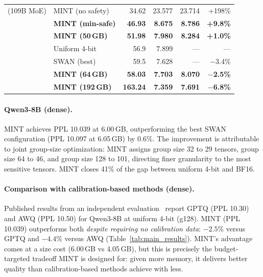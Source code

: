 \documentclass{article}
\begin{document}
\begin{table}[h]
\begin{tabular}{llrrrr}
(109B MoE) & MINT (no safety) & 34.62 & 23.577 & 23.714 & +198\% \\
 & \textbf{MINT (min-safe)} & \textbf{46.93} & \textbf{8.675} & \textbf{8.786} & \textbf{+9.8\%} \\
 & \textbf{MINT (50\,GB)} & \textbf{51.98} & \textbf{7.980} & \textbf{8.284} & \textbf{+1.0\%} \\
 & Uniform 4-bit & 56.9 & 7.899 & --- & --- \\
 & SWAN (best) & 59.5 & 7.628 & --- & $-$3.4\% \\
 & \textbf{MINT (64\,GB)} & \textbf{58.03} & \textbf{7.703} & \textbf{8.070} & \textbf{$-$2.5\%} \\
 & \textbf{MINT (192\,GB)} & \textbf{163.24} & \textbf{7.359} & \textbf{7.691} & \textbf{$-$6.8\%} \\
\bottomrule
\end{tabular}
\end{table}

\paragraph{Qwen3-8B (dense).} MINT achieves PPL 10.039 at 6.00\,GB, outperforming the best SWAN configuration (PPL 10.097 at 6.05\,GB) by 0.6\%. The improvement is attributable to joint group-size optimization: MINT assigns group size 32 to 29 tensors, group size 64 to 46, and group size 128 to 101, directing finer granularity to the most sensitive tensors. MINT closes 41\% of the gap between uniform 4-bit and BF16.

\paragraph{Comparison with calibration-based methods (dense).} Published results from an independent evaluation~\cite{xu2025qwen3quant} report GPTQ (PPL 10.30) and AWQ (PPL 10.50) for Qwen3-8B at uniform 4-bit (g128). MINT (PPL 10.039) outperforms both \emph{despite requiring no calibration data}: $-2.5\%$ versus GPTQ and $-4.4\%$ versus AWQ (Table~\ref{tab:main_results}). MINT's advantage comes at a size cost (6.00\,GB vs 4.05\,GB), but this is precisely the budget-targeted tradeoff MINT is designed for: given more memory, it delivers better quality than calibration-based methods achieve with less.
\end{document}
